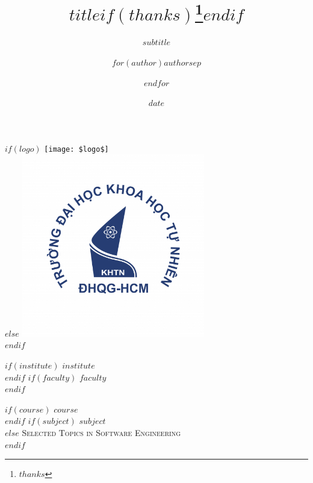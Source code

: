\documentclass[a4paper, 12pt]{article}
\title{$title$$if(thanks)$\thanks{$thanks$}$endif$}
\subtitle{$subtitle$}
\author{$for(author)$$author$$sep$ \and $endfor$}
\date{$date$}
\begin{document}

% 

\begin{titlepage}
\newcommand{\HRule}{\rule{\linewidth}{0.5mm}} %

\centering
$if(logo)$
\texttt{[image: \$logo\$]}\\[1cm] %
$else$
\includegraphics[width=8cm]{logo.png}\\[1cm] %
$endif$

\center %

$if(institute)$
\textsc{\LARGE $institute$}\\[0.5cm]
$endif$
$if(faculty)$
\textsc{\Large $faculty$}\\[0.5cm]
$endif$

$if(course)$
\textsc{\Large $course$}\\[0.5cm]
$endif$
$if(subject)$
\textsc{\large $subject$}\\[0.5cm]
$else$
\textsc{\large Selected Topics in Software Engineering}\\[0.5cm]
$endif$


\end{titlepage}
\end{document}
